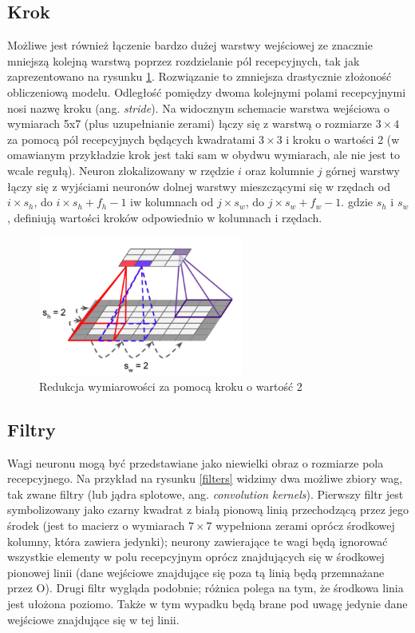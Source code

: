 \documentclass{article}
\begin{document}
\subsection{Krok}
Możliwe jest również łączenie bardzo dużej warstwy wejściowej ze znacznie mniejszą kolejną warstwą poprzez rozdzielanie pól recepcyjnych, tak jak zaprezentowano na rysunku \ref{step}. Rozwiązanie to zmniejsza drastycznie złożoność obliczeniową modelu. Odległość pomiędzy dwoma kolejnymi polami recepcyjnymi nosi nazwę kroku (ang. \textit{stride}). Na widocznym schemacie warstwa wejściowa o wymiarach 5x7 (plus uzupełnianie zerami) łączy się z warstwą o rozmiarze $3 \times 4$ za pomocą pól recepcyjnych będących kwadratami $3 \times 3$ i kroku o wartości 2 (w omawianym przykładzie krok jest taki sam w obydwu wymiarach, ale nie jest to wcale regułą). Neuron zlokalizowany w rzędzie $i$ oraz kolumnie $j$ górnej warstwy łączy się z wyjściami neuronów dolnej warstwy mieszczącymi się w rzędach od $i\times s_{h}$, do $i \times s_{h}+f_{h}-1$ iw kolumnach od $j \times s_{w}$, do $j \times s_{w}+f_{w}-1$. gdzie $s_{h}$ i $s_{w}$, definiują wartości kroków odpowiednio w kolumnach i rzędach. \cite{geron}
\begin{figure}[H]
	\centering
	\includegraphics[width=0.6\textwidth,keepaspectratio=true]{step}
	\caption{Redukcja wymiarowości za pomocą kroku o wartość 2 \cite{geron}}
	\label{step}
\end{figure}


\subsection{Filtry}
Wagi neuronu mogą być przedstawiane jako niewielki obraz o rozmiarze pola recepcyjnego. Na przykład na rysunku \ref{filters} widzimy dwa możliwe zbiory wag, tak zwane filtry (lub jądra splotowe, ang. \textit{convolution kernels}). Pierwszy filtr jest symbolizowany jako czarny kwadrat z białą pionową linią przechodzącą przez jego środek (jest to macierz o wymiarach $7 \times 7$ wypełniona zerami oprócz środkowej kolumny, która zawiera jedynki); neurony zawierające te wagi będą ignorować wszystkie elementy w polu recepcyjnym oprócz znajdujących się w środkowej pionowej linii (dane wejściowe znajdujące się poza tą linią będą przemnażane przez O). Drugi filtr wygląda podobnie; różnica polega na tym, że środkowa linia jest ułożona poziomo. Także w tym wypadku będą brane pod uwagę jedynie dane wejściowe znajdujące się w tej linii. \cite{geron}
\end{document}
